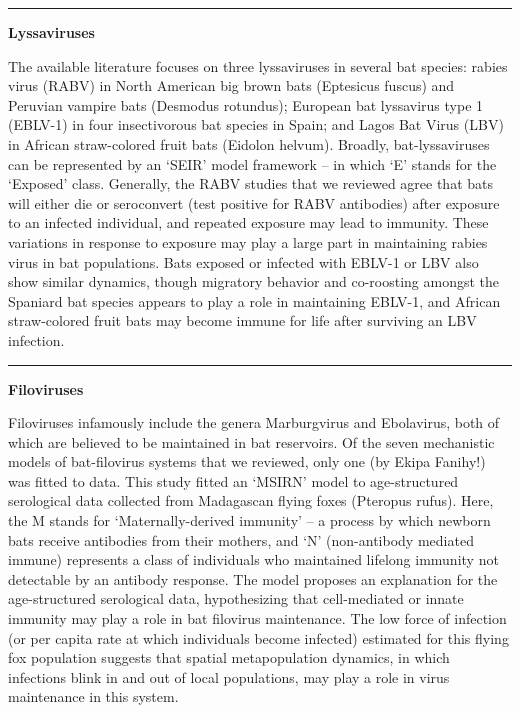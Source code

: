 \documentclass[
]{article}
\begin{document}
\begin{center}\rule{0.5\linewidth}{0.5pt}\end{center}

\textbf{Lyssaviruses}

The available literature focuses on three lyssaviruses in several bat
species: rabies virus (RABV) in North American big brown bats (Eptesicus
fuscus) and Peruvian vampire bats (Desmodus rotundus); European bat
lyssavirus type 1 (EBLV-1) in four insectivorous bat species in Spain;
and Lagos Bat Virus (LBV) in African straw-colored fruit bats (Eidolon
helvum). Broadly, bat-lyssaviruses can be represented by an `SEIR' model
framework -- in which `E' stands for the `Exposed' class. Generally, the
RABV studies that we reviewed agree that bats will either die or
seroconvert (test positive for RABV antibodies) after exposure to an
infected individual, and repeated exposure may lead to immunity. These
variations in response to exposure may play a large part in maintaining
rabies virus in bat populations. Bats exposed or infected with EBLV-1 or
LBV also show similar dynamics, though migratory behavior and
co-roosting amongst the Spaniard bat species appears to play a role in
maintaining EBLV-1, and African straw-colored fruit bats may become
immune for life after surviving an LBV infection.

\begin{center}\rule{0.5\linewidth}{0.5pt}\end{center}

\textbf{Filoviruses}

Filoviruses infamously include the genera Marburgvirus and Ebolavirus,
both of which are believed to be maintained in bat reservoirs. Of the
seven mechanistic models of bat-filovirus systems that we reviewed, only
one (by Ekipa Fanihy!) was fitted to data. This study fitted an `MSIRN'
model to age-structured serological data collected from Madagascan
flying foxes (Pteropus rufus). Here, the M stands for
`Maternally-derived immunity' -- a process by which newborn bats receive
antibodies from their mothers, and `N' (non-antibody mediated immune)
represents a class of individuals who maintained lifelong immunity not
detectable by an antibody response. The model proposes an explanation
for the age-structured serological data, hypothesizing that
cell-mediated or innate immunity may play a role in bat filovirus
maintenance. The low force of infection (or per capita rate at which
individuals become infected) estimated for this flying fox population
suggests that spatial metapopulation dynamics, in which infections blink
in and out of local populations, may play a role in virus maintenance in
this system.
\end{document}
